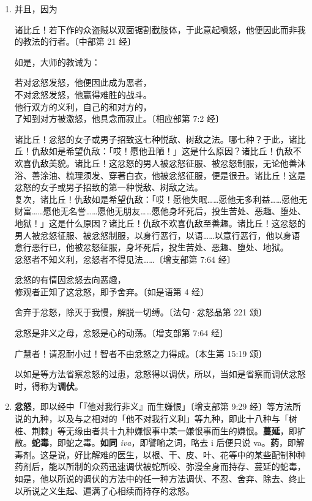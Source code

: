\begin{enumerate}
\item 并且，因为\begin{quoting}诸比丘！若下作的众盗贼以双面锯割截肢体，于此意起嗔怒，他便因此而非我的教法的行者。{\bluefootnotesize 〔中部第 21 经〕}\end{quoting}如是，大师的教诫为：\begin{quoting}若对忿怒发怒，他便因此成为恶者，\\不对忿怒发怒，他赢得难胜的战斗。\\他行双方的义利，自己的和对方的，\\了知到对方被激怒，他具念而寂止。{\bluefootnotesize 〔相应部第 7:2 经〕}\end{quoting}\begin{quoting}诸比丘！忿怒的女子或男子招致这七种悦敌、树敌之法。哪七种？于此，诸比丘！仇敌如是希望仇敌：「哎！愿他丑陋！」这是什么原因？诸比丘！仇敌不欢喜仇敌美貌。诸比丘！这忿怒的男人被忿怒征服、被忿怒制服，无论他善沐浴、善涂油、梳理须发、穿著白衣，他被忿怒征服，便是很丑。诸比丘！这是忿怒的女子或男子招致的第一种悦敌、树敌之法。\\复次，诸比丘！仇敌如是希望仇敌：「哎！愿他失眠……愿他无多利益……愿他无财富……愿他无名誉……愿他无朋友……愿他身坏死后，投生苦处、恶趣、堕处、地狱！」这是什么原因？诸比丘！仇敌不欢喜仇敌至善趣。诸比丘！这忿怒的男人被忿怒征服、被忿怒制服，以身行恶行，以语……以意行恶行，他以身语意行恶行已，他被忿怒征服，身坏死后，投生苦处、恶趣、堕处、地狱。\\忿怒者不知义利，忿怒者不得见法……{\bluefootnotesize 〔增支部第 7:64 经〕}\end{quoting}\begin{quoting}忿怒的有情因忿怒去向恶趣，\\修观者正知了这忿怒，即予舍弃。{\bluefootnotesize 〔如是语第 4 经〕}\end{quoting}\begin{quoting}舍弃于忿怒，除灭于我慢，解脱一切缚。{\bluefootnotesize 〔法句·忿怒品第 221 颂〕}\end{quoting}\begin{quoting}忿怒是非义之母，忿怒是心的动荡。{\bluefootnotesize 〔增支部第 7:64 经〕}\end{quoting}\begin{quoting}广慧者！请忍耐小过！智者不由忿怒之力得成。{\bluefootnotesize 〔本生第 15:19 颂〕}\end{quoting}以如是等方法省察忿怒的过患，忿怒得以调伏，所以，当如是省察而调伏忿怒时，得称为\textbf{调伏}。
\item \textbf{忿怒}，即以经中「『他对我行非义』而生嫌恨」{\bluefootnotesize 〔增支部第 9:29 经〕}等方法所说的九种，以及与之相对的「他不对我行义利」等九种，即此十八种与「树桩、荆棘」等无缘由者共十九种嫌恨事中某一嫌恨事而生的嫌恨。\textbf{蔓延}，即扩散。\textbf{蛇毒}，即蛇之毒。\textbf{如同} \textit{iva}，即譬喻之词，略去 i 后便只说 va。\textbf{药}，即解毒剂。这是说，好比解难的医生，以根、干、皮、叶、花等中的某些配制种种药剂后，能以所制的众药迅速调伏被蛇所咬、弥漫全身而持存、蔓延的蛇毒，如是，他以所说的调伏的方法中的任一种方法调伏、不忍、舍弃、除去、终止以所说之义生起、遍满了心相续而持存的忿怒。

\end{enumerate}
